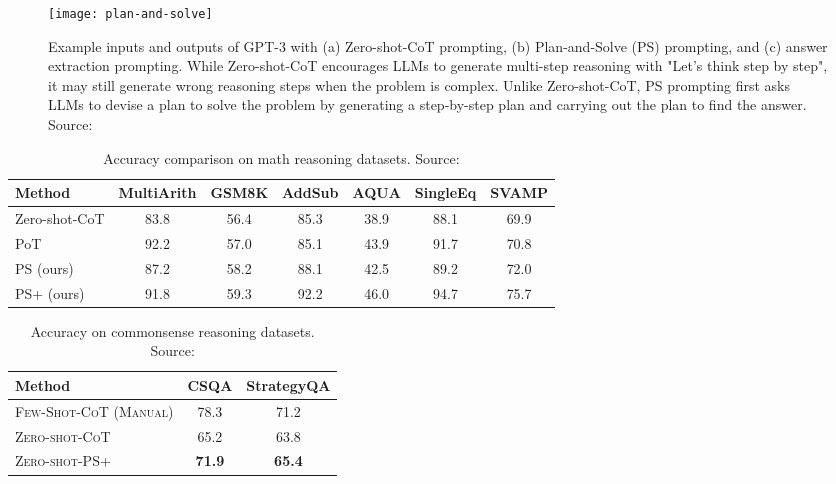 \begin{figure}[h!]
	\centering
	\texttt{[image: plan-and-solve]}
	\caption{Example inputs and outputs of GPT-3 with (a) Zero-shot-CoT prompting, (b) Plan-and-Solve (PS) prompting, and (c) answer extraction prompting. While Zero-shot-CoT encourages LLMs to generate multi-step reasoning with "Let’s think step by step", it may still generate wrong reasoning steps when the problem is complex. Unlike Zero-shot-CoT, PS prompting first asks LLMs to devise a plan to solve the problem by generating a step-by-step plan and carrying out the plan to find the answer. Source: \textcite{wang2023plan}}
	\label{fig:plan-and-solve}
\end{figure}

\begin{table}[h!]
	\centering
	\begin{tabularx}{\textwidth}{Xcccccc}
		\hline
		\textbf{Method} & \textbf{MultiArith} & \textbf{GSM8K} & \textbf{AddSub} & \textbf{AQUA} & \textbf{SingleEq} & \textbf{SVAMP} \\
		\hline
		Zero-shot-CoT   & 83.8                & 56.4           & 85.3            & 38.9          & 88.1              & 69.9           \\
		PoT             & 92.2                & 57.0           & 85.1            & 43.9          & 91.7              & 70.8           \\
		PS (ours)       & 87.2                & 58.2           & 88.1            & 42.5          & 89.2              & 72.0           \\
		PS+ (ours)      & 91.8                & 59.3           & 92.2            & 46.0          & 94.7              & 75.7           \\
		\hline
	\end{tabularx}
	\caption{Accuracy comparison on math reasoning datasets. Source: \textcite{wang2023plan}}
	\label{tab:ps-math-accuracy}
\end{table}

\begin{table}[h!]
	\centering
	\begin{tabularx}{\textwidth}{Xcc}
		\hline
		\textbf{Method}                & \textbf{CSQA} & \textbf{StrategyQA} \\ \hline
		\textsc{Few-Shot-CoT (Manual)} & 78.3          & 71.2                \\
		\textsc{Zero-shot-CoT}         & 65.2          & 63.8                \\
		\textsc{Zero-shot-PS+}         & \textbf{71.9} & \textbf{65.4}       \\ \hline
	\end{tabularx}
	\caption{Accuracy on commonsense reasoning datasets. Source: \textcite{wang2023plan}}
	\label{tab:commonsense_reasoning}
\end{table}


